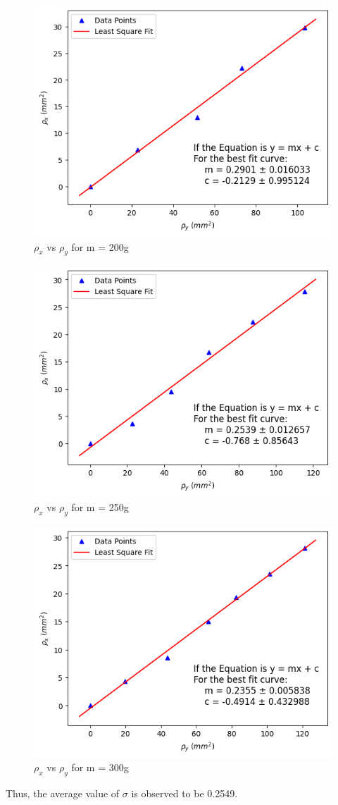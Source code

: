      \begin{figure}[H]
        \centering
        \label{graph:4}
        \includegraphics[width=0.8\columnwidth]{images/4.png}
        \caption{$\rho_x$ vs $\rho_y$ for m = 200g}
    \end{figure}

    \begin{figure}[H]
        \centering
        \label{graph:4}
        \includegraphics[width=0.8\columnwidth]{images/5.png}
        \caption{$\rho_x$ vs $\rho_y$ for m = 250g}
    \end{figure}

    \begin{figure}[H]
        \centering
        \label{graph:4}
        \includegraphics[width=0.8\columnwidth]{images/6.png}
        \caption{$\rho_x$ vs $\rho_y$ for m = 300g}
    \end{figure}

    Thus, the average value of $\sigma$ is observed to be 0.2549.